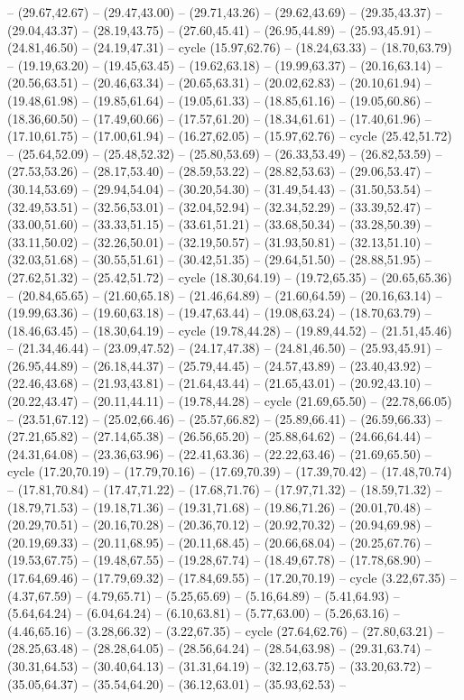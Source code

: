 {-- (29.67,42.67) -- (29.47,43.00) -- (29.71,43.26) -- (29.62,43.69) -- (29.35,43.37) -- (29.04,43.37) -- (28.19,43.75) -- (27.60,45.41) -- (26.95,44.89) -- (25.93,45.91) -- (24.81,46.50) -- (24.19,47.31) -- cycle (15.97,62.76) -- (18.24,63.33) -- (18.70,63.79) -- (19.19,63.20) -- (19.45,63.45) -- (19.62,63.18) -- (19.99,63.37) -- (20.16,63.14) -- (20.56,63.51) -- (20.46,63.34) -- (20.65,63.31) -- (20.02,62.83) -- (20.10,61.94) -- (19.48,61.98) -- (19.85,61.64) -- (19.05,61.33) -- (18.85,61.16) -- (19.05,60.86) -- (18.36,60.50) -- (17.49,60.66) -- (17.57,61.20) -- (18.34,61.61) -- (17.40,61.96) -- (17.10,61.75) -- (17.00,61.94) -- (16.27,62.05) -- (15.97,62.76) -- cycle (25.42,51.72) -- (25.64,52.09) -- (25.48,52.32) -- (25.80,53.69) -- (26.33,53.49) -- (26.82,53.59) -- (27.53,53.26) -- (28.17,53.40) -- (28.59,53.22) -- (28.82,53.63) -- (29.06,53.47) -- (30.14,53.69) -- (29.94,54.04) -- (30.20,54.30) -- (31.49,54.43) -- (31.50,53.54) -- (32.49,53.51) -- (32.56,53.01) -- (32.04,52.94) -- (32.34,52.29) -- (33.39,52.47) -- (33.00,51.60) -- (33.33,51.15) -- (33.61,51.21) -- (33.68,50.34) -- (33.28,50.39) -- (33.11,50.02) -- (32.26,50.01) -- (32.19,50.57) -- (31.93,50.81) -- (32.13,51.10) -- (32.03,51.68) -- (30.55,51.61) -- (30.42,51.35) -- (29.64,51.50) -- (28.88,51.95) -- (27.62,51.32) -- (25.42,51.72) -- cycle (18.30,64.19) -- (19.72,65.35) -- (20.65,65.36) -- (20.84,65.65) -- (21.60,65.18) -- (21.46,64.89) -- (21.60,64.59) -- (20.16,63.14) -- (19.99,63.36) -- (19.60,63.18) -- (19.47,63.44) -- (19.08,63.24) -- (18.70,63.79) -- (18.46,63.45) -- (18.30,64.19) -- cycle (19.78,44.28) -- (19.89,44.52) -- (21.51,45.46) -- (21.34,46.44) -- (23.09,47.52) -- (24.17,47.38) -- (24.81,46.50) -- (25.93,45.91) -- (26.95,44.89) -- (26.18,44.37) -- (25.79,44.45) -- (24.57,43.89) -- (23.40,43.92) -- (22.46,43.68) -- (21.93,43.81) -- (21.64,43.44) -- (21.65,43.01) -- (20.92,43.10) -- (20.22,43.47) -- (20.11,44.11) -- (19.78,44.28) -- cycle (21.69,65.50) -- (22.78,66.05) -- (23.51,67.12) -- (25.02,66.46) -- (25.57,66.82) -- (25.89,66.41) -- (26.59,66.33) -- (27.21,65.82) -- (27.14,65.38) -- (26.56,65.20) -- (25.88,64.62) -- (24.66,64.44) -- (24.31,64.08) -- (23.36,63.96) -- (22.41,63.36) -- (22.22,63.46) -- (21.69,65.50) -- cycle (17.20,70.19) -- (17.79,70.16) -- (17.69,70.39) -- (17.39,70.42) -- (17.48,70.74) -- (17.81,70.84) -- (17.47,71.22) -- (17.68,71.76) -- (17.97,71.32) -- (18.59,71.32) -- (18.79,71.53) -- (19.18,71.36) -- (19.31,71.68) -- (19.86,71.26) -- (20.01,70.48) -- (20.29,70.51) -- (20.16,70.28) -- (20.36,70.12) -- (20.92,70.32) -- (20.94,69.98) -- (20.19,69.33) -- (20.11,68.95) -- (20.11,68.45) -- (20.66,68.04) -- (20.25,67.76) -- (19.53,67.75) -- (19.48,67.55) -- (19.28,67.74) -- (18.49,67.78) -- (17.78,68.90) -- (17.64,69.46) -- (17.79,69.32) -- (17.84,69.55) -- (17.20,70.19) -- cycle (3.22,67.35) -- (4.37,67.59) -- (4.79,65.71) -- (5.25,65.69) -- (5.16,64.89) -- (5.41,64.93) -- (5.64,64.24) -- (6.04,64.24) -- (6.10,63.81) -- (5.77,63.00) -- (5.26,63.16) -- (4.46,65.16) -- (3.28,66.32) -- (3.22,67.35) -- cycle (27.64,62.76) -- (27.80,63.21) -- (28.25,63.48) -- (28.28,64.05) -- (28.56,64.24) -- (28.54,63.98) -- (29.31,63.74) -- (30.31,64.53) -- (30.40,64.13) -- (31.31,64.19) -- (32.12,63.75) -- (33.20,63.72) -- (35.05,64.37) -- (35.54,64.20) -- (36.12,63.01) -- (35.93,62.53) -- }
